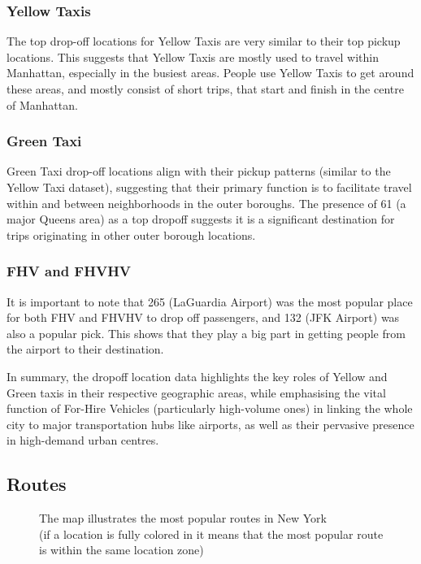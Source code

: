 \documentclass[conference]{IEEEtran}
\begin{document}
\subsubsection*{Yellow Taxis} The top drop-off locations for Yellow Taxis are very similar to their top pickup locations.
This suggests that Yellow Taxis are mostly used to travel within Manhattan, especially in the busiest areas. People use
Yellow Taxis to get around these areas, and mostly consist of short trips, that start and finish in the centre of Manhattan.

\subsubsection*{Green Taxi} Green Taxi drop-off locations align with their pickup patterns (similar to the Yellow Taxi
dataset), suggesting that their primary function is to facilitate travel within and between neighborhoods in the outer
boroughs. The presence of 61 (a major Queens area) as a top dropoff suggests it is a significant destination for trips
originating in other outer borough locations.

\subsubsection*{FHV and FHVHV} It is important to note that 265 (LaGuardia Airport) was the most popular place for both
FHV and FHVHV to drop off passengers, and 132 (JFK Airport) was also a popular pick. This shows that they play a big
part in getting people from the airport to their destination.

In summary, the dropoff location data highlights the key roles of Yellow and Green taxis in their respective geographic
areas, while emphasising the vital function of For-Hire Vehicles (particularly high-volume ones) in linking the whole
city to major transportation hubs like airports, as well as their pervasive presence in high-demand urban centres.

\subsection{Routes}

\begin{figure}[htbp]
  \label{fig:most-popular-routes}
  \centering
  
  \caption{The map illustrates the most popular routes in New York \\
  (if a location is fully colored in it means that the most popular route is within the same location zone)}
\end{figure}
\end{document}
